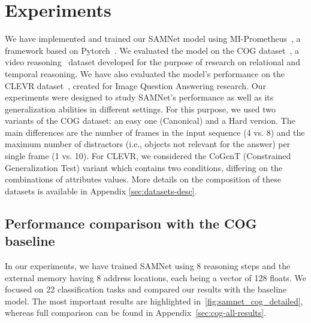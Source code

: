 \section{Experiments}

We have implemented and trained our SAMNet model using MI-Prometheus~\cite{kornuta2018accelerating}, a framework based on Pytorch~\cite{paszke2017automatic}.
We evaluated the model on the COG dataset~\cite{yang2018dataset}, a video reasoning~\cite{mogadala2019trends} dataset developed for the purpose of research on relational and temporal reasoning. We have also evaluated the model's performance on the CLEVR dataset~\cite{johnson2017clevr}, created for Image Question Answering research.
Our experiments were designed to study SAMNet's performance as well as its generalization abilities in different settings.
For this purpose, we used two variants of the COG dataset: an easy one (Canonical) and a Hard version. The main differences are the number of frames in the input sequence (4 vs. 8) and the maximum number of distractors (i.e., objects not relevant for the answer) per single frame (1 vs. 10).
For CLEVR, we considered the CoGenT (Constrained Generalization Test) variant which contains two conditions, differing on the combinations of attributes values. More details on the composition of these datasets is available in Appendix \ref{sec:datasets-desc}.

\subsection{Performance comparison with the COG baseline}

In our experiments, we have trained SAMNet using 8 reasoning steps and the external memory having 8 address locations, each being a vector of 128 floats.
We focused on 22 classification tasks and compared our results with the baseline model.
The most important results are highlighted in~\cref{fig:samnet_cog_detailed}, whereas full comparison can be found in Appendix~\ref{sec:cog-all-results}.

